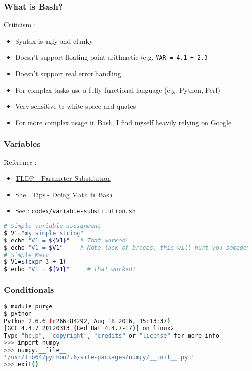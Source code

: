 \documentclass{beamer}
\newcommand{\code}[1]{\colorbox{codegray}{\texttt{#1}}}
\begin{document}
\begin{frame}
\frametitle{What is Bash?}
Criticism : 
\begin{itemize}
    \item Syntax is ugly and clunky
    \pause
    \item Doesn't support floating point arithmetic (e.g. \code{VAR = 4.1 + 2.3}
    \pause
    \item Doesn't support real error handling
    \pause
    \item For complex tasks use a fully functional language (e.g. Python, Perl)
    \pause
    \item Very sensitive to white space and quotes
    \pause
    \item For more complex usage in Bash, I find myself heavily relying on Google
\end{itemize}
\end{frame}



\begin{frame}[fragile]
\frametitle{Variables}
Reference :
\begin{itemize}
    \item \href{https://tldp.org/LDP/abs/html/parameter-substitution.html}{TLDP - Parameter Substitution}
    \pause
    \item \href{https://www.shell-tips.com/bash/math-arithmetic-calculation/}{Shell Tips - Doing Math in Bash}
    \pause
    \item See : \code{codes/variable-substitution.sh}
\end{itemize}
\begingroup
\scriptsize
\begin{lstlisting}[backgroundcolor = \color{codegray}, language = Bash, showstringspaces=false]
# Simple variable assignment
$ V1="my simple string"
$ echo "V1 = ${V1}"   # That worked!
$ echo "V1 = $V1"     # Note lack of braces, this will hurt you someday
# Simple Math
$ V1=$(expr 3 + 1)
$ echo "V1 = ${V1}"     # That worked!
\end{lstlisting}
\endgroup
\end{frame}



\begin{frame}[fragile]
\frametitle{Conditionals}
\begingroup
\scriptsize
\begin{lstlisting}[backgroundcolor = \color{codegray}, language = Bash, showstringspaces=false]
$ module purge
$ python
Python 2.6.6 (r266:84292, Aug 18 2016, 15:13:37)
[GCC 4.4.7 20120313 (Red Hat 4.4.7-17)] on linux2
Type "help", "copyright", "credits" or "license" for more info
>>> import numpy
>>> numpy.__file__
'/usr/lib64/python2.6/site-packages/numpy/__init__.pyc'
>>> exit()
\end{lstlisting}
\endgroup
\end{frame}
\end{document}
